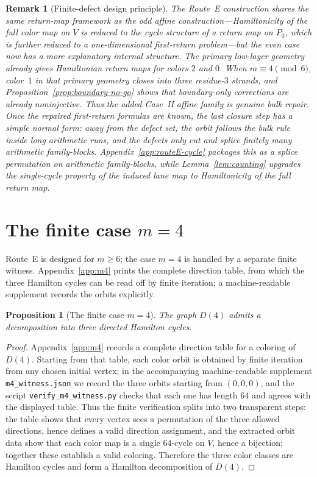 \documentclass[11pt]{article}
\newtheorem{proposition}{Proposition}
\newtheorem{remark}{Remark}
\begin{document}
\begin{remark}[Finite-defect design principle]
The Route~E construction shares the same return-map framework as the odd affine construction---Hamiltonicity of the full color map on $V$ is reduced to the cycle structure of a return map on $P_0$, which is further reduced to a one-dimensional first-return problem---but the even case now has a more explanatory internal structure.
The primary low-layer geometry already gives Hamiltonian return maps for colors $2$ and $0$.
When $m\equiv 4\pmod 6$, color~$1$ in that primary geometry closes into three residue-$3$ strands, and Proposition~\ref{prop:boundary-no-go} shows that boundary-only corrections are already noninjective.
Thus the added Case~II affine family is genuine bulk repair.
Once the repaired first-return formulas are known, the last closure step has a simple normal form: away from the defect set, the orbit follows the bulk rule inside long arithmetic runs, and the defects only cut and splice finitely many arithmetic family-blocks.
Appendix~\ref{app:routeE-cycle} packages this as a splice permutation on arithmetic family-blocks, while Lemma~\ref{lem:counting} upgrades the single-cycle property of the induced lane map to Hamiltonicity of the full return map.
\end{remark}
\section{The finite case $m=4$}\label{sec:m4}

Route~E is designed for $m\ge 6$; the case $m=4$ is handled by a separate finite witness.
Appendix~\ref{app:m4} prints the complete direction table, from which the three Hamilton cycles can be read off by finite iteration; a machine-readable supplement records the orbits explicitly.

\begin{proposition}[The finite case $m=4$]\label{prop:m4-main}
The graph $D(4)$ admits a decomposition into three directed Hamilton cycles.
\end{proposition}

\begin{proof}
Appendix~\ref{app:m4} records a complete direction table for a coloring of $D(4)$.
Starting from that table, each color orbit is obtained by finite iteration from any chosen initial vertex; in the accompanying machine-readable supplement \texttt{m4\_witness.json} we record the three orbits starting from $(0,0,0)$, and the script \texttt{verify\_m4\_witness.py} checks that each one has length $64$ and agrees with the displayed table.
Thus the finite verification splits into two transparent steps: the table shows that every vertex sees a permutation of the three allowed directions, hence defines a valid direction assignment, and the extracted orbit data show that each color map is a single $64$-cycle on $V$, hence a bijection; together these establish a valid coloring.
Therefore the three color classes are Hamilton cycles and form a Hamilton decomposition of $D(4)$.
\end{proof}
\end{document}
